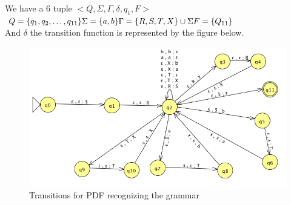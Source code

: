 \begin{problem}{1}
\begin{solution}
\begin{figure}[H]
{      }
    \end{figure}
  \end{solution}
\end{problem}

\begin{problem}{2}
\end{problem}

\begin{problem}{3}
  \begin{solution}
    We have a 6 tuple $<Q, \Sigma, \Gamma, \delta, q_1, F>$ \\
    \(
      Q = \{ q_1, q_2, \ldots, q_{11} \} \\
      \Sigma = \{ a, b \} \\
      \Gamma = \{R, S, T, X \} \cup \Sigma \\
      F = \{ Q_{11} \}
    \) \\
    And $\delta$ the transition function is represented by the figure below.
    \begin{figure}[H]
      \centering
      \caption{Transitions for PDF recognizing the grammar}
      \includegraphics[scale=.6]{problem_3.png}
    \end{figure}
  \end{solution}
\end{problem}

